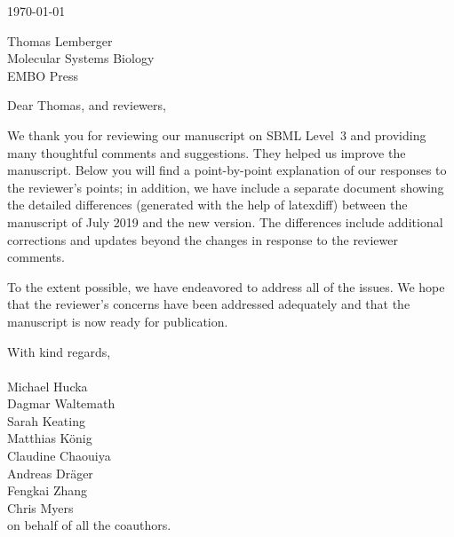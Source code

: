 \documentclass[11pt]{mhletter}
\begin{document}
\thispagestyle{empty}


\vspace*{4em}

\hspace{4.1in}\today

\vspace*{1em}

\begin{flushleft}
Thomas Lemberger\\
Molecular Systems Biology\\
EMBO Press
\end{flushleft}

\vspace*{1em}

\setlength{\parskip}{0.7em}

Dear Thomas, and reviewers,

We thank you for reviewing our manuscript on SBML Level~3 and providing many thoughtful comments and suggestions.  They helped us improve the manuscript.  Below you will find a point-by-point explanation of our responses to the reviewer's points; in addition, we have include a separate document showing the detailed differences (generated with the help of latexdiff) between the manuscript of July 2019 and the new version.  The differences include additional corrections and updates beyond the changes in response to the reviewer comments.

To the extent possible, we have endeavored to address all of the issues.  We hope that the reviewer's concerns have been addressed adequately and that the manuscript is now ready for publication.


\vspace*{1em}
\hspace{4in}
\begin{minipage}{3in}
With kind regards,\\
\\[1ex]
Michael Hucka\\
Dagmar Waltemath\\
Sarah Keating\\
Matthias K\"{o}nig\\
Claudine Chaouiya\\
Andreas Dr\"{a}ger\\
Fengkai Zhang\\
Chris Myers\\
on behalf of all the coauthors.
\end{minipage}
\end{document}
